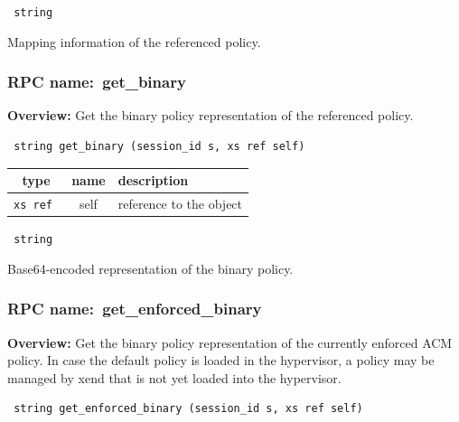\vspace{0.3cm}

{\tt
string
}


Mapping information of the referenced policy.
\vspace{0.3cm}
\vspace{0.3cm}
\vspace{0.3cm}
\subsubsection{RPC name:~get\_binary}

{\bf Overview:}
Get the binary policy representation of the referenced policy.

\begin{verbatim} string get_binary (session_id s, xs ref self)\end{verbatim}




\vspace{0.3cm}
\begin{tabular}{|c|c|p{7cm}|}
 \hline
{\bf type} & {\bf name} & {\bf description} \\ \hline
{\tt xs ref } & self & reference to the object \\ \hline

\end{tabular}

\vspace{0.3cm}

{\tt
string
}


Base64-encoded representation of the binary policy.
\vspace{0.3cm}
\vspace{0.3cm}
\vspace{0.3cm}
\subsubsection{RPC name:~get\_enforced\_binary}

{\bf Overview:}
Get the binary policy representation of the currently enforced ACM policy.
In case the default policy is loaded in the hypervisor, a policy may be
managed by xend that is not yet loaded into the hypervisor.

\begin{verbatim} string get_enforced_binary (session_id s, xs ref self)\end{verbatim}


